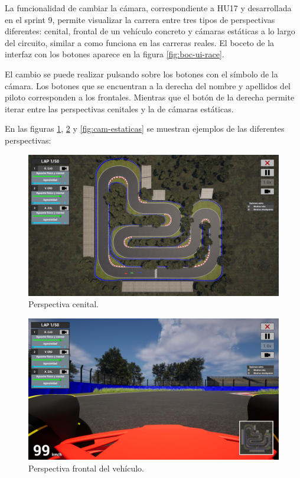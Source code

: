 La funcionalidad de cambiar la cámara, correspondiente a HU17 y desarrollada en el sprint 9, permite visualizar la carrera entre tres tipos de perspectivas diferentes: cenital, frontal de un vehículo concreto y cámaras estáticas a lo largo del circuito, similar a como funciona en las carreras reales. El boceto de la interfaz con los botones aparece en la figura \ref{fig:boc-ui-race}.

\bigskip

El cambio se puede realizar pulsando sobre los botones con el símbolo de la cámara. Los botones que se encuentran a la derecha del nombre y apellidos del piloto corresponden a los frontales. Mientras que el botón de la derecha permite iterar entre las perspectivas cenitales y la de cámaras estáticas.

\bigskip

En las figuras \ref{fig:cenital}, \ref{fig:frontal} y \ref{fig:cam-estaticas} se muestran ejemplos de las diferentes perspectivas:

\begin{figure}[H]
    \centering
    \includegraphics[width=\textwidth]{imagenes/camera/cam-top.jpg}
    \caption{Perspectiva cenital.}
    \label{fig:cenital}
\end{figure}

\begin{figure}[H]
    \centering
    \includegraphics[width=\textwidth]{imagenes/camera/cam-frontal.jpg}
    \caption{Perspectiva frontal del vehículo.}
    \label{fig:frontal}
\end{figure}

